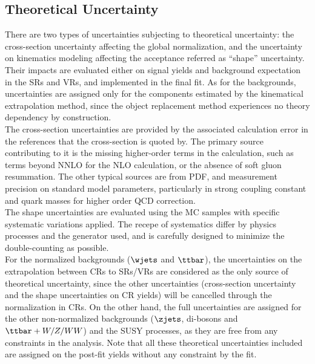 \subsection{Theoretical Uncertainty} 
There are two types of uncertainties subjecting to theoretical uncertainty: the cross-section uncertainty affecting the global normalization, and the uncertainty on kinematics modeling affecting the acceptance referred as ``shape'' uncertainty.
Their impacts are evaluated either on signal yields and background expectation in the SRs and VRs, and implemented in the final fit. 
As for the backgrounds, uncertainties are assigned only for the components estimated by the kinematical extrapolation method, since the object replacement method experiences no theory dependency by construction. \\

The cross-section uncertainties are provided by the associated calculation error in the references that the cross-section is quoted by. The primary source contributing to it is the missing higher-order terms in the calculation, such as terms beyond NNLO for the NLO calculation, or the absence of soft gluon resummation. The other typical sources are from PDF, and measurement precision on standard model parameters, particularly in strong coupling constant and quark masses for higher order QCD correction.  \\
The shape uncertainties are evaluated using the MC samples with specific systematic variations applied. 
The recepe of systematics differ by physics processes and the generator used, and is carefully designed to minimize the double-counting as possible. \\

For the normalized backgrounds ($\wjets$ and $\ttbar$), the uncertainties on the extrapolation between CRs to SRs/VRs are considered as the only source of theoretical uncertainty, 
since the other uncertainties (cross-section uncertainty and the shape uncertainties on CR yields) will be cancelled through the normalization in CRs. 
On the other hand, the full uncertainties are assigned for the other non-normalized backgrounds ($\zjets$, di-bosons and $\ttbar+W/Z/WW$) and the SUSY processes, as they are free from any constraints in the analysis.
Note that all these theoretical uncertainties included are assigned on the post-fit yields without any constraint by the fit.


